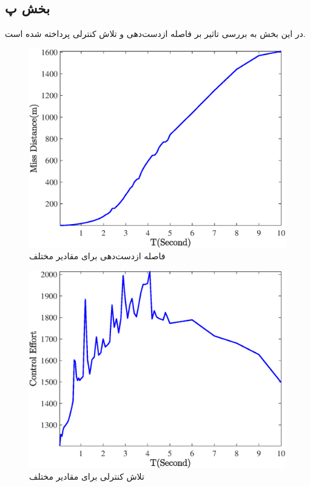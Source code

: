 \subsection{بخش پ}
در این بخش به بررسی تاثیر
بر فاصله‌ ازدست‌دهی و تلاش کنترلی پرداخته شده است.
\begin{figure}[H]
	\centering
	\includegraphics[width=.75\linewidth]{../Figure/Q1/c/MD}
	\caption{فاصله ازدست‌دهی برای مقادیر مختلف }
\end{figure}

\begin{figure}[H]
	\centering
	\includegraphics[width=.75\linewidth]{../Figure/Q1/c/CE}
	\caption{تلاش کنترلی برای مقادیر مختلف }
\end{figure}